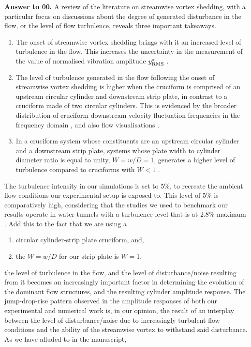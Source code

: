 \documentclass[12pt]{article}
\newcounter{question}
\newcommand{\name}{00}
\newcommand{\answer}[1]{\noindent \textbf{Answer to \name.\thequestion}\vskip 0.25cm \noindent #1 \mbox{}\\}
\begin{document}
\answer{
  A review of the literature on streamwise vortex shedding, with a particular focus on discussions about the degree of generated disturbance in the flow, or the level of flow turbulence, reveals three important takeaways.

  \begin{enumerate}
    \item The onset of streamwise vortex shedding brings with it an increased level of turbulence in the flow. This increases the uncertainty in the measurement of the \rms{} value of normalised vibration amplitude $y^{*}_{\text{RMS}}$ \citep{Shirakashi1989,Zhao2018a}.
    \item The level of turbulence generated  in the flow following the onset of streamwise vortex shedding is higher when the cruciform is comprised of an upstream circular cylinder and downstream strip plate, in contrast to a cruciform made of two circular cylinders. This is evidenced by the broader distribution of cruciform downstream velocity fluctuation frequencies in the frequency domain \citep{Kato2006,Kato2012}, and also flow visualisations \citep{Kato2012,Koide2017}.
    \item In a cruciform system whose constituents are an upstream circular cylinder and a downstream strip plate, systems whose plate width to cylinder diameter ratio is equal to unity, $W = w/D = 1$, generates a higher level of turbulence compared to cruciforms with $W < 1$ \citep{Kato2012}.
  \end{enumerate}

  The turbulence intensity in our simulations is set to 5\%, to recreate the ambient flow conditions our experimental setup is exposed to. This level of 5\% is comparatively high, considering that the studies we used to benchmark our results operate in water tunnels with a turbulence level that is at 2.8\% maximum \citep{Nguyen2012,Koide2013}. Add this to the fact that we are using a 

  \begin{enumerate}
    \item circular cylinder-strip plate cruciform, and,
    \item the $W = w/D$ for our strip plate is $W = 1$,
  \end{enumerate}

  \noindent the level of turbulence in the flow, and the level of disturbance/noise resulting from it becomes an increasingly important factor in determining the evolution of the dominant flow structures, and the resulting cylinder amplitude response. The jump-drop-rise pattern observed in the amplitude responses of both our experimental and numerical work is, in our opinion, the result of an interplay between the level of disturbance/noise due to increasingly turbulent flow conditions and the ability of the streamwise vortex to withstand said disturbance. As we have alluded to in the manuscript,

}
\end{document}
